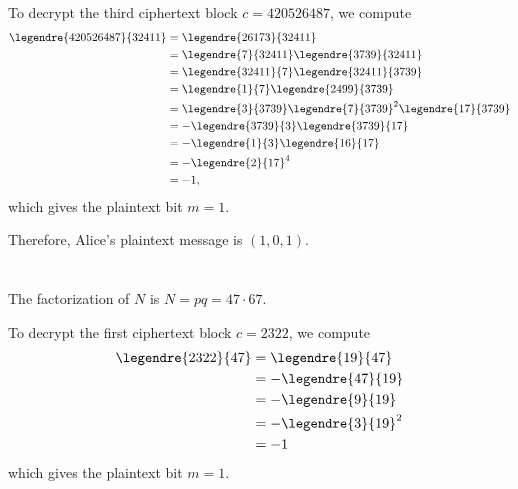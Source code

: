 \documentclass[
  coursecode={MTHE 418},
  assignmentname={Homework \homeworknumber},
  studentnumber=20053722,
  name={Bryan Hoang},
  draft,
]{
  ltxanswer%
}
\begin{document}
\begin{questions}
\begin{parts}
\begin{solution}
        To decrypt the third ciphertext block \(c = 420526487\), we compute
        \begin{align*}
          \legendre{420526487}{32411} &= \legendre{26173}{32411}                                       \\
                                      &= \legendre{7}{32411} \legendre{3739}{32411}                    \\
                                      &= \legendre{32411}{7} \legendre{32411}{3739}                    \\
                                      &= \legendre{1}{7} \legendre{2499}{3739}                         \\
                                      &= \legendre{3}{3739} \legendre{7}{3739}^{2} \legendre{17}{3739} \\
                                      &= -\legendre{3739}{3} \legendre{3739}{17}                       \\
                                      &= -\legendre{1}{3} \legendre{16}{17}                            \\
                                      &= -\legendre{2}{17}^{4}                                         \\
                                      &= -1,
        \end{align*}
        which gives the plaintext bit \(m = 1\).

        Therefore, Alice's plaintext message is \(\boxed{(1, 0, 1)}\).
      \end{solution}

      \part{}
      \begin{solution}
        The factorization of \(N\) is \(N = pq = 47 \cdot 67\).

        To decrypt the first ciphertext block \(c = 2322\), we compute
        \begin{align*}
          \legendre{2322}{47} &= \legendre{19}{47}     \\
                              &= -\legendre{47}{19}    \\
                              &= -\legendre{9}{19}     \\
                              &= -\legendre{3}{19}^{2} \\
                              &= -1
        \end{align*}
        which gives the plaintext bit \(m = 1\).


\end{solution}
\end{parts}
\end{questions}
\end{document}
